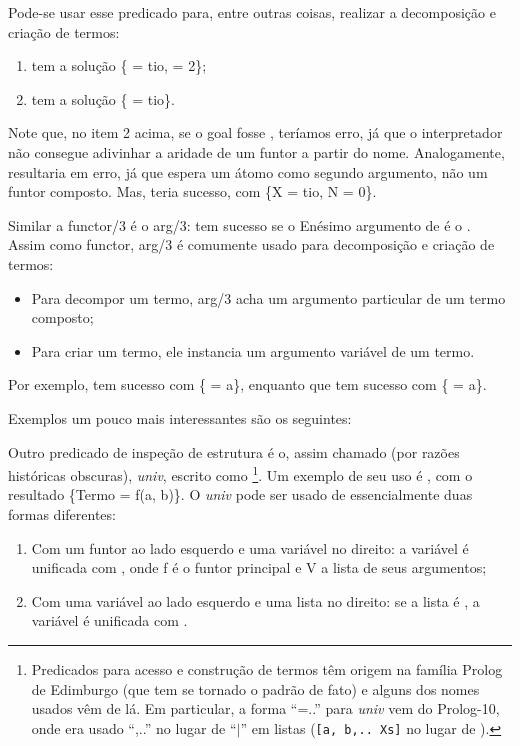 \documentclass{article}
\begin{document}
Pode-se usar esse predicado para, entre outras coisas, realizar a decomposição e criação de termos:
\begin{enumerate}
  \item{} tem a solução \{ = tio,  = 2\};
  \item{} tem a solução \{ = tio\}.
\end{enumerate}

Note que, no item 2 acima, se o goal fosse , teríamos erro, já que o interpretador não consegue adivinhar a aridade de um funtor a partir do nome. Analogamente,
 resultaria em erro, já que  espera um átomo como segundo argumento, não um funtor composto. Mas,  teria sucesso, com \{X = tio, N = 0\}.

Similar a functor/3 é o arg/3:  tem sucesso se o Enésimo argumento de  é o . Assim como functor, arg/3 é comumente usado para decomposição e criação de termos:
\begin{itemize}
  \item Para decompor um termo, arg/3 acha um argumento particular de um termo composto;
  \item Para criar um termo, ele instancia um argumento variável de um termo.
\end{itemize}

Por exemplo,  tem sucesso com \{ = a\}, enquanto que  tem sucesso com \{ = a\}.

Exemplos um pouco mais interessantes são os seguintes:





Outro predicado de inspeção de estrutura é o, assim chamado (por razões históricas obscuras), \textit{univ}, escrito como \footnote{Predicados para acesso e construção de termos têm origem na família Prolog de Edimburgo (que tem se tornado o padrão de fato) e alguns dos nomes usados vêm de lá. Em particular, a forma “=..” para \textit{univ} vem do Prolog-10, onde era usado “,..” no lugar de “$|$” em listas ({\tt[a, b,.. Xs]} no lugar de \codigo{[a, b|Xs]}).}. Um exemplo de seu uso é , com o resultado \{Termo = f(a, b)\}.
O \textit{univ} pode ser usado de essencialmente duas formas diferentes:
\begin{enumerate}
  \item Com um funtor ao lado esquerdo e uma variável no direito: a variável é unificada com \codigo{[f|v]}, onde f é o funtor principal e V a lista de seus argumentos;
  \item Com uma variável ao lado esquerdo e uma lista no direito: se a lista é \codigo{[a, $b_1$, ..., $b_n$]}, a variável é unificada com .
\end{enumerate}
\end{document}
